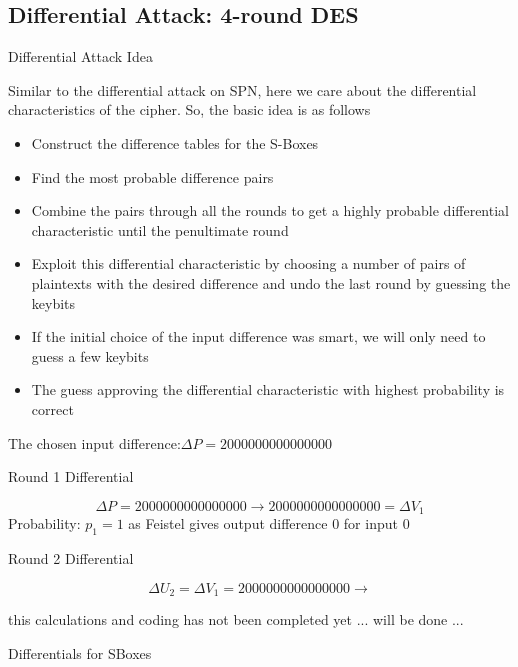 \documentclass[9pt]{beamer}
\begin{document}
\subsection{Differential Attack: 4-round DES}
\begin{frame}
Differential Attack Idea

\vspace{5mm}
Similar to the differential attack on SPN, here we care about the differential characteristics of the cipher. So, the basic idea is as follows

\begin{itemize}
\item{Construct the difference tables for the S-Boxes}
\item{Find the most probable difference pairs}
\item{Combine the pairs through all the rounds to get a highly probable differential characteristic until the penultimate round}
\item{Exploit this differential characteristic by choosing a number of pairs of plaintexts with the desired difference and undo the last round by guessing the keybits}
\item{If the initial choice of the input difference was smart, we will only need to guess a few keybits}
\item{The guess approving the differential characteristic with highest probability is correct}
\end{itemize}

\end{frame}

\begin{frame}
The chosen input difference:$\Delta P = 20 00 00 00 00 00 00 00$

Round 1 Differential

\[ \Delta P = 20 00 00 00 00 00 00 00 \rightarrow 20 00 00 00 00 00 00 00 = \Delta V_1 \]
Probability: $p_1 = 1$ as Feistel gives output difference $0$ for input $0$

Round 2 Differential

\[ \Delta U_2 = \Delta V_1 = 20 00 00 00 00 00 00 00 \rightarrow \]

this calculations and coding has not been completed yet ... will be done ...
\end{frame}

\begin{frame}
Differentials for SBoxes



\end{frame}
\end{document}
